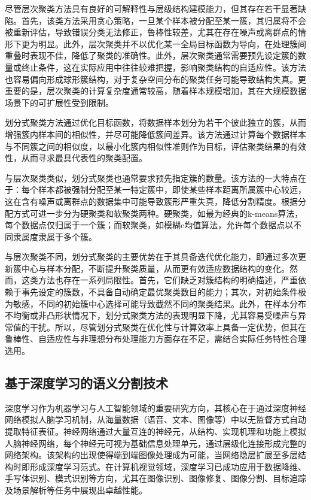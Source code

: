 尽管层次聚类方法具有良好的可解释性与层级结构建模能力，但其存在若干显著缺陷。首先，该类方法采用贪心策略，一旦某个样本被分配至某一簇，其归属将不会被重新评估，导致错误分类无法修正，鲁棒性较差，尤其在存在噪声或离群点的情形下更为明显。此外，层次聚类并不以优化某一全局目标函数为导向，在处理簇间重叠时表现不佳，降低了聚类的准确性。此外，层次聚类通常需要预先设定簇的数量或终止条件，这在实际应用中往往较难把握，影响聚类结构的自适应性。该方法也容易偏向形成球形簇结构，对于复杂空间分布的聚类任务可能导致结构失真。更重要的是，层次聚类的计算复杂度通常较高，随着样本规模增加，其在大规模数据场景下的可扩展性受到限制。

划分式聚类方法通过优化目标函数，将数据样本划分为若干个彼此独立的簇，从而增强簇内样本间的相似性，并尽可能降低簇间差异。该方法通过计算每个数据样本与不同簇之间的相似度，以最小化簇内相似性准则作为目标，评估聚类结果的有效性，从而寻求最具代表性的聚类配置。

与层次聚类类似，划分式聚类也通常要求预先指定簇的数量。该方法的一大特点在于：每个样本都被强制分配至某一特定簇中，即使某些样本距离所属簇中心较远，这在含有噪声或离群点的数据集中可能导致簇形严重失真，降低分割精度。根据分配方式可进一步分为硬聚类和软聚类两种。硬聚类，如最为经典的k-means算法，每个数据点仅归属于一个簇；而软聚类，如模糊c均值算法，允许每个数据点以不同隶属度隶属于多个簇。

与层次聚类不同，划分式聚类的主要优势在于其具备迭代优化能力，即通过多次更新簇中心与样本分配，不断提升聚类质量，从而更有效适应数据结构的变化。然而，这类方法也存在一系列局限性。首先，它们缺乏对簇结构的明确描述，严重依赖于事先设定的簇数，不具备自动确定最优聚类数目的能力；其次，对初始条件极为敏感，不同的初始簇中心选择可能导致截然不同的聚类结果。此外，在样本分布不均衡或非凸形状情况下，划分式聚类方法的表现明显下降，尤其容易受噪声与异常值的干扰。所以，尽管划分式聚类在优化性与计算效率上具备一定优势，但其在鲁棒性、自适应性与非理想分布处理能力方面存在不足，需结合实际任务特性合理选用。

\subsection{基于深度学习的语义分割技术}

深度学习作为机器学习与人工智能领域的重要研究方向，其核心在于通过深度神经网络模拟人脑学习机制，从海量数据（语音、文本、图像等）中以无监督方式自动提取特征表征。神经网络通过大量互连的神经元，从结构、实现机理和功能上模拟人脑神经网络，每个神经元可视为基础信息处理单元，通过层级化连接形成完整的网络架构\cite{qiu2020nndl}。该架构的出现使得端到端图像处理成为可能，当网络隐层扩展至多层结构时即形成深度学习范式。在计算机视觉领域，深度学习已成功应用于数据降维、手写体识别、模式识别等方向，尤其在图像识别、图像修复、图像分割、目标追踪及场景解析等任务中展现出卓越性能。

